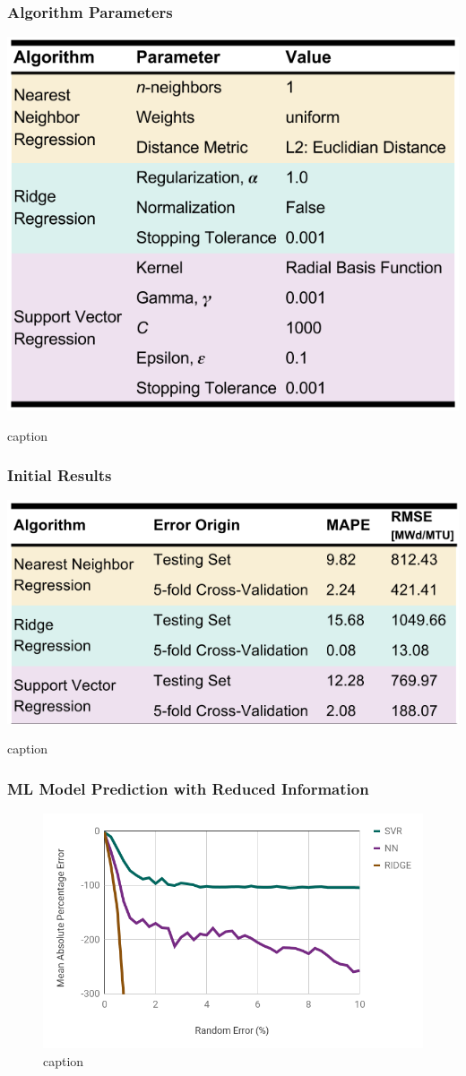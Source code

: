 
\begin{frame}
  \frametitle{Algorithm Parameters}
  \begin{table}
    \centering
    \includegraphics[height=0.8\textheight]{./figures/defaults.png}
    \caption{caption}
  \end{table}
\end{frame}

\begin{frame}
  \frametitle{Initial Results}
  \begin{table}
    \centering
    \includegraphics[height=0.8\textheight]{./figures/results1.png}
    \caption{caption}
  \end{table}
\end{frame}

\begin{frame}
  \frametitle{ML Model Prediction with Reduced Information}
  \begin{figure}
    \centering
    \includegraphics[height=0.8\textheight]{./figures/randerr.png}
    \caption{caption}
  \end{figure}
\end{frame}

